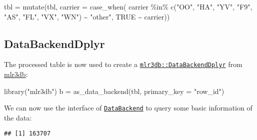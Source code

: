 \documentclass[
]{scrbook}
\newenvironment{Shaded}{\begin{snugshade}}{\end{snugshade}}
\newcommand{\AttributeTok}[1]{\textcolor[rgb]{0.77,0.63,0.00}{#1}}
\newcommand{\ConstantTok}[1]{\textcolor[rgb]{0.00,0.00,0.00}{#1}}
\newcommand{\FunctionTok}[1]{\textcolor[rgb]{0.00,0.00,0.00}{#1}}
\newcommand{\NormalTok}[1]{#1}
\newcommand{\OtherTok}[1]{\textcolor[rgb]{0.56,0.35,0.01}{#1}}
\newcommand{\SpecialCharTok}[1]{\textcolor[rgb]{0.00,0.00,0.00}{#1}}
\newcommand{\StringTok}[1]{\textcolor[rgb]{0.31,0.60,0.02}{#1}}
\renewenvironment{Shaded} {\begin{snugshade}\small} {\end{snugshade}}
\begin{document}
\begin{Shaded}
\begin{Highlighting}[]
\NormalTok{tbl }\OtherTok{=} \FunctionTok{mutate}\NormalTok{(tbl, }\AttributeTok{carrier =} \FunctionTok{case\_when}\NormalTok{(}
\NormalTok{  carrier }\SpecialCharTok{\%in\%} \FunctionTok{c}\NormalTok{(}\StringTok{"OO"}\NormalTok{, }\StringTok{"HA"}\NormalTok{, }\StringTok{"YV"}\NormalTok{, }\StringTok{"F9"}\NormalTok{, }\StringTok{"AS"}\NormalTok{, }\StringTok{"FL"}\NormalTok{, }\StringTok{"VX"}\NormalTok{, }\StringTok{"WN"}\NormalTok{) }\SpecialCharTok{\textasciitilde{}} \StringTok{"other"}\NormalTok{,}
  \ConstantTok{TRUE} \SpecialCharTok{\textasciitilde{}}\NormalTok{ carrier))}
\end{Highlighting}
\end{Shaded}

\hypertarget{databackenddplyr}{%
\subsection{DataBackendDplyr}\label{databackenddplyr}}

The processed table is now used to create a \href{https://mlr3db.mlr-org.com/reference/DataBackendDplyr.html}{\texttt{mlr3db::DataBackendDplyr}} from \href{https://mlr3db.mlr-org.com}{mlr3db}:

\begin{Shaded}
\begin{Highlighting}[]
\FunctionTok{library}\NormalTok{(}\StringTok{"mlr3db"}\NormalTok{)}
\NormalTok{b }\OtherTok{=} \FunctionTok{as\_data\_backend}\NormalTok{(tbl, }\AttributeTok{primary\_key =} \StringTok{"row\_id"}\NormalTok{)}
\end{Highlighting}
\end{Shaded}

We can now use the interface of \href{https://mlr3.mlr-org.com/reference/DataBackend.html}{\texttt{DataBackend}} to query some basic information of the data:

\begin{Shaded}
\end{Shaded}

\begin{verbatim}
## [1] 163707
\end{verbatim}

\begin{Shaded}
\end{Shaded}
\end{document}
